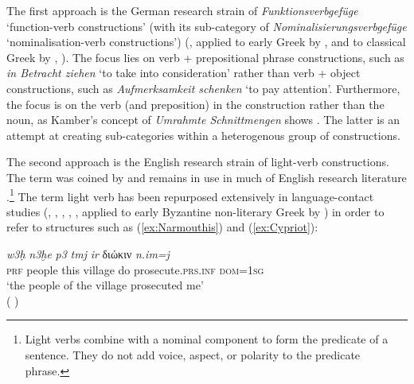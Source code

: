 \documentclass[output=paper,colorlinks,citecolor=brown]{langscibook}
\begin{document}
The first approach is the German research strain of \textit{Funktionsverbgefüge} `function-verb constructions' (with its sub-category of \textit{Nominalisierungs\-verb\-gefüge} `nominalisation-verb constructions') (\citealt{vonpolenzFunktionsverbenFunktionsverbgefugeUnd1987, kamberFunktionsverbgefugeEmpirischKorpusbasierte2008, storrerCorpusbasedInvestigationsGerman2009, deknopFunktionsverbgefuegeImFokus2020}, applied to early Greek by \citealt{schutzeichelIndogermanischeFunktionsverbgefuege2014}, and to classical Greek by \citealt{tronciSyntagmePrepositionnelGrec2016}, \citealt{tronciLexiconsyntaxInterfaceAncient2017}).
The focus lies on verb + prepositional phrase constructions, such as \textit{in Betracht ziehen} `to take into consideration' rather than verb + object constructions, such as \textit{Aufmerksamkeit schenken} `to pay attention'. Furthermore, the focus is on the verb (and preposition) in the construction rather than the noun, as Kamber’s concept of \textit{Umrahmte Schnittmengen} shows \citep[23]{kamberFunktionsverbgefugeEmpirischKorpusbasierte2008}. The latter is an attempt at creating sub-categories within a heterogenous group of constructions. 


The second approach is the English research strain of light-verb constructions. The term was coined by \citet{jespersenModernEnglishGrammar1954} and remains in use in much of English research literature \citep{buttStructureComplexPredicates1995, buttLightVerbJungle2010, buttDiachronicPertinacityLight2013}.\footnote{Light verbs combine with a nominal component to form the predicate of a sentence. They do not add voice, aspect, or polarity to the predicate phrase.} The term light verb has been repurposed extensively in language-contact studies (\citealt[132]{bakkerMixedLanguagesAutonomous2003}, \citealt[134–139]{myers-scottonContactLinguisticsBilingual2002}, \citealt{reintgesCodemixingStrategiesCoptic2001}, \citealt[148]{ronanMobilizingLinguisticConcepts2012}, \citealt[203]{rutherfordBilingualismRomanEgypt2010}, applied to early Byzantine non-literary Greek by \citealt{fendelCopticInterferenceSyntax2022}) in order to refer to structures such as (\ref{ex:Narmouthis}) and (\ref{ex:Cypriot}):


\ea\label{ex:Narmouthis}
\settowidth {}
\gll \textit{w3ḥ} \textit{n3ḫe} \textit{p3} \textit{tmj} \textit{ir} διώκιν \textit{n.im=j} \\
\textsc{prf} people this village do prosecute.\textsc{prs.inf} \textsc{dom}=\textsc{1sg}\\ 
\glt ‘the people of the village prosecuted me’ \\
\hspace*{\fill}( \citealt[203]{rutherfordBilingualismRomanEgypt2010})
\end{document}
